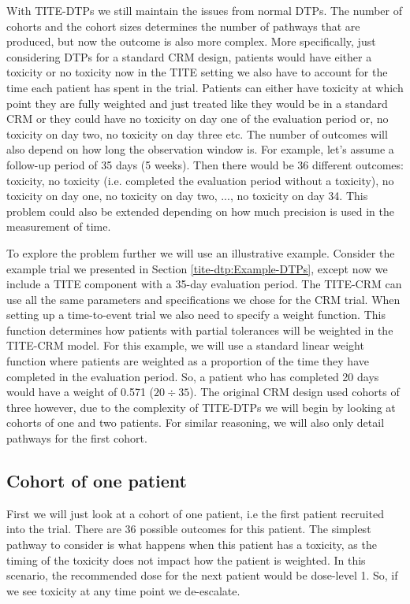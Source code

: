 With TITE-DTPs we still maintain the issues from normal DTPs. The number of cohorts and the cohort sizes determines the number of pathways that are produced, but now the outcome is also more complex. More specifically, just considering DTPs for a standard CRM design, patients would have either a toxicity or no toxicity now in the TITE setting we also have to account for the time each patient has spent in the trial. Patients can either have toxicity at which point they are fully weighted and just treated like they would be in a standard CRM or they could have no toxicity on day one of the evaluation period or, no toxicity on day two, no toxicity on day three etc. The number of outcomes will also depend on how long the observation window is. For example, let's assume a follow-up period of 35 days (5 weeks). Then there would be 36 different outcomes: toxicity, no toxicity (i.e. completed the evaluation period without a toxicity), no toxicity on day one, no toxicity on day two, ..., no toxicity on day 34. This problem could also be extended depending on how much precision is used in the measurement of time. 

To explore the problem further we will use an illustrative example. Consider the example trial we presented in Section \ref{tite-dtp:Example-DTPs}, except now we include a TITE component with a 35-day evaluation period. The TITE-CRM can use all the same parameters and specifications we chose for the CRM trial. When setting up a time-to-event trial we also need to specify a weight function. This function determines how patients with partial tolerances will be weighted in the TITE-CRM model. For this example, we will use a standard linear weight function where patients are weighted as a proportion of the time they have completed in the evaluation period. So, a patient who has completed 20 days would have a weight of 0.571 ($20 \div 35$). The original CRM design used cohorts of three however, due to the complexity of TITE-DTPs we will begin by looking at cohorts of one and two patients. For similar reasoning, we will also only detail pathways for the first cohort. 


\subsection{Cohort of one patient}
\label{tite-dtp:TITE-DTPs-c1}

First we will just look at a cohort of one patient, i.e the first patient recruited into the trial. There are 36 possible outcomes for this patient. The simplest pathway to consider is what happens when this patient has a toxicity, as the timing of the toxicity does not impact how the patient is weighted. In this scenario, the recommended dose for the next patient would be dose-level 1. So, if we see toxicity at any time point we de-escalate.   

